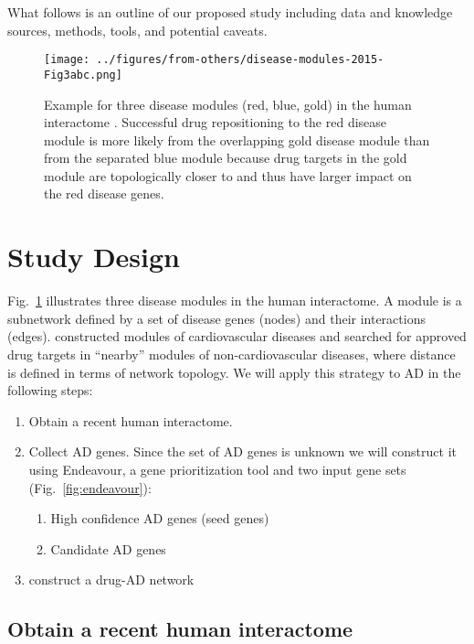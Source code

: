 \documentclass[letterpaper]{article}
\begin{document}
What follows is an outline of our proposed study including data and knowledge
sources, methods, tools, and potential caveats.

\begin{figure}
\begin{center}
\texttt{[image: ../figures/from-others/disease-modules-2015-Fig3abc.png]}
\end{center}
\caption{Example for three disease modules (red, blue, gold) in the human
	interactome \citep{Cheng2018}.  Successful drug repositioning to the red disease module is more likely
from the overlapping gold disease module than from 
the separated blue module because drug targets in the gold module are
topologically closer to and thus have larger impact on the red disease genes.}
\label{fig:3modules}
\end{figure}

\section{Study Design}

Fig.~\ref{fig:3modules} illustrates three disease modules in the human
interactome.  A module is a subnetwork defined by a set of disease genes (nodes)
and their interactions (edges). \cite{Cheng2018} constructed modules of
cardiovascular diseases and searched for approved drug targets in ``nearby''
modules of non-cardiovascular diseases, where distance is defined in terms of network
topology.  We will apply this strategy to AD in the following steps:

\begin{enumerate}
\item Obtain a recent human interactome.  
\item Collect AD genes.  Since the set of AD genes is unknown
	we will construct it using Endeavour, a gene prioritization tool
	\citep{Tranchevent2016} and two input gene sets
	(Fig.~\ref{fig:endeavour}):
\begin{enumerate}
	\item High confidence AD genes (seed genes)
	\item Candidate AD genes
\end{enumerate}
\item construct a drug-AD network~\citep{Cheng2018}
\end{enumerate}

\subsection{Obtain a recent human interactome}
\end{document}
